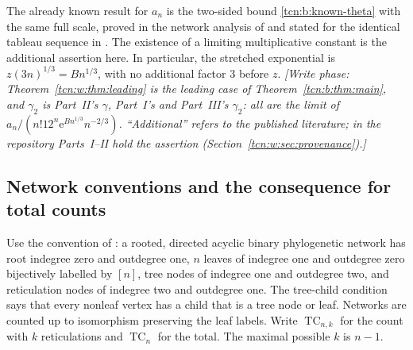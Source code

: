 \documentclass[11pt,letterpaper]{article}
\newcommand{\ee}{\mathrm e}
\newcommand{\TC}{\operatorname{TC}}
\theoremstyle{remark}
\begin{document}
The already known result for $a_n$ is the two-sided bound \eqref{tcn:b:known-theta} with the same full scale, proved in the network analysis of \cite{FYZ2021} and stated for the identical tableau sequence in \cite[Theorem 4.1]{BW2021}. The existence of a limiting multiplicative constant is the additional assertion here. In particular, the stretched exponential is $z(3n)^{1/3}=Bn^{1/3}$, with no additional factor $3$ before $z$. \emph{[Write phase: Theorem~\ref{tcn:w:thm:leading} is the leading case of Theorem~\ref{tcn:b:thm:main}, and $\gamma_2$ is Part~II's $\gamma$, Part~I's and Part~III's $\gamma_2$: all are the limit of $a_n/(n!12^n\ee^{Bn^{1/3}}n^{-2/3})$. ``Additional'' refers to the published literature; in the repository Parts~I--II hold the assertion (Section~\ref{tcn:w:sec:provenance}).]}

\subsection{Network conventions and the consequence for total counts}
Use the convention of \cite[Definition 1]{FYZ2021}: a rooted, directed acyclic binary phylogenetic network has root indegree zero and outdegree one, $n$ leaves of indegree one and outdegree zero bijectively labelled by $[n]$, tree nodes of indegree one and outdegree two, and reticulation nodes of indegree two and outdegree one. The tree-child condition says that every nonleaf vertex has a child that is a tree node or leaf. Networks are counted up to isomorphism preserving the leaf labels. Write $\TC_{n,k}$ for the count with $k$ reticulations and $\TC_n$ for the total. The maximal possible $k$ is $n-1$.
\end{document}
